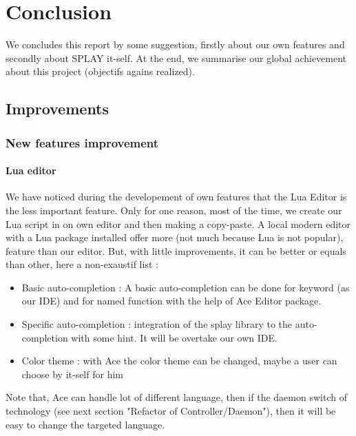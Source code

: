 \documentclass{eplmastersthesis}
\begin{document}
  \chapter{Conclusion}

    We concludes this report by some suggestion, firstly about our own features and secondly about
    SPLAY it-self. At the end, we summarise our global achievement about this project (objectifs agains realized).

    \section{Improvements}

      \subsection{New features improvement}

        \subsubsection{Lua editor}

        We have noticed during the developement of own features that the Lua Editor is
        the less important feature. Only for one reason, most of the time, we
        create our Lua script in on own editor and then making a copy-paste.
        A local modern editor with a Lua package installed offer more (not much because Lua is not popular),
        feature than our editor. But, with little improvements, it can be better or equals than other,
        here a non-exaustif list :

        \begin{itemize}
          \item Basic auto-completion : A basic auto-completion can be done for keyword (as our IDE) and
          for named function with the help of Ace Editor package.
          \item Specific auto-completion : integration of the splay library to the auto-completion with some
          hint. It will be overtake our own IDE.
          \item Color theme : with Ace the color theme can be changed, maybe a user can choose by it-self for him
        \end{itemize}

        Note that, Ace can handle lot of different language,
        then if the daemon switch of technology (see next section "Refactor of Controller/Daemon"),
        then it will be easy to change the targeted language.
\end{document}
